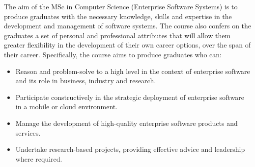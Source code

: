\documentclass[openany,twoside]{report}
\begin{document}

\begin{programmeAim}{The aim of the MSc in Computer Science (Enterprise Software Systems) is} to produce graduates with the necessary knowledge, skills and expertise in the development and management of software systems. The course also confers on the graduates a set of personal and professional attributes that will allow them greater flexibility in the development of their own career options, over the span of their career. Specifically, the course aims to produce graduates who can:

\vspace{12pt}
	\begin{itemize}[nolistsep]
		\item
		Reason and problem-solve to a high level in the context of enterprise software and its role in business, industry and research.
		\item
		Participate constructively in the strategic deployment of enterprise software in a mobile or cloud environment.
		\item
		Manage the development of high-quality enterprise software products and services.
		\item
		Undertake research-based projects, providing effective advice and leadership where required.
	\end{itemize}

\end{programmeAim}

\vfill\mbox{}

\vfill


\end{document}
